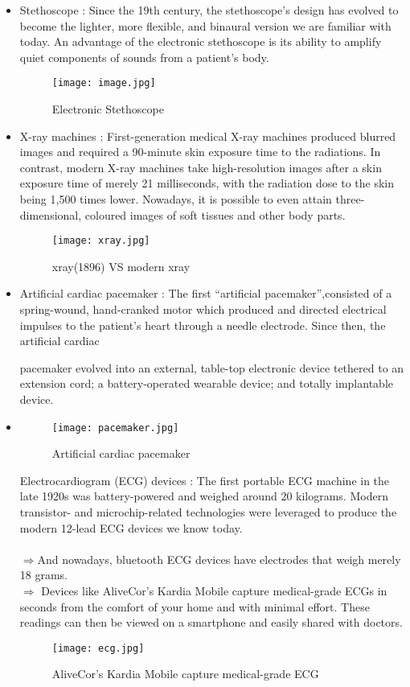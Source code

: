 \documentclass[12pt]{article}
\begin{document}
\begin{itemize}
\item Stethoscope : Since the 19th century, the stethoscope’s design has evolved to become the lighter, more flexible, and binaural version we are familiar with today. An advantage of the electronic stethoscope is its ability to amplify quiet components of sounds from a patient’s body.
\begin{figure}[h]
\centering
\texttt{[image: image.jpg]}
\caption{Electronic Stethoscope}
\end{figure}
\item X-ray machines : First-generation medical X-ray machines produced blurred images and required a 90-minute skin exposure time to the radiations. In contrast, modern X-ray machines take high-resolution images after a skin exposure time of merely 21 milliseconds, with the radiation dose to the skin being 1,500 times lower. Nowadays, it is possible to even attain three-dimensional, coloured images of soft tissues and other body parts.

\begin{figure}[h]
\centering
\texttt{[image: xray.jpg]}
\caption{xray(1896) VS modern xray}
\end{figure}

\item Artificial cardiac pacemaker : The first “artificial pacemaker”,consisted of a spring-wound, hand-cranked motor which produced and directed electrical impulses to the patient’s heart through a needle electrode. Since then, the artificial cardiac

 pacemaker evolved into an external, table-top electronic device tethered to an extension cord; a battery-operated wearable device; and totally implantable device. 
 

\item
\begin{figure}[h]
\centering
\texttt{[image: pacemaker.jpg]}
\caption{Artificial cardiac pacemaker}
\end{figure}

 Electrocardiogram (ECG) devices :  The first portable ECG machine in the late 1920s was battery-powered and weighed around 20 kilograms. Modern transistor- and microchip-related technologies were leveraged to produce the modern 12-lead ECG devices we know today.\\
\\ $ \Rightarrow $And nowadays, bluetooth ECG devices have electrodes that weigh merely 18 grams.\\

$ \Rightarrow $ Devices like AliveCor’s Kardia Mobile capture medical-grade ECGs in seconds from the comfort of your home and with minimal effort. These readings can then be viewed on a smartphone and easily shared with doctors.
 \begin{figure}[h]
\centering
\texttt{[image: ecg.jpg]}
\caption{AliveCor’s Kardia Mobile capture medical-grade ECG}
\end{figure}




\end{itemize}
\end{document}
